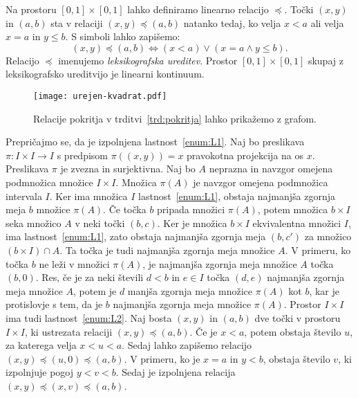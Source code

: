 \documentclass[../TG_magistrsko_delo_sections.tex]{subfiles}
\begin{document}
\begin{primer}
Na prostoru $[0, 1] \times [0, 1]$ lahko definiramo linearno relacijo $\preccurlyeq$. Točki $(x, y)$ in $(a, b)$ sta v relaciji $(x, y) \preccurlyeq (a, b)$ natanko tedaj, ko velja $x < a$ ali velja $x = a$ in $y \leq b$. S simboli lahko zapišemo:
$$(x, y) \preccurlyeq (a, b) \Leftrightarrow (x < a) \lor (x = a \land y \leq b).$$
Relacijo $\preccurlyeq$ imenujemo \emph{leksikografska ureditev}. Prostor $[0, 1] \times [0, 1]$ skupaj z leksikografsko ureditvijo je linearni kontinuum. 

\begin{figure}[h]
  \centering
  \texttt{[image: urejen-kvadrat.pdf]}
  \caption[Primer vektorske slike.]{Relacije pokritja v trditvi~\ref{trd:pokritja} lahko prikažemo z grafom.}
  \label{fig:varsavski_lok}
\end{figure}

Prepričajmo se, da je izpolnjena lastnost~\ref{enum:L1}. Naj bo preslikava $\pi : I \times I \to I$ s predpisom $\pi((x, y)) = x$ pravokotna projekcija na os $x$. Preslikava $\pi$ je zvezna in surjektivna. Naj bo $A$ neprazna in navzgor omejena podmnožica množice $I \times I$. Množica $\pi(A)$ je navzgor omejena podmnožica intervala $I$. Ker ima množica $I$ lastnost~\ref{enum:L1}, obstaja najmanjša zgornja meja $b$ množice $\pi(A)$. Če točka $b$ pripada množici $\pi(A)$, potem množica $b \times I$ seka množico $A$ v neki točki $(b, c)$. Ker je množica $b \times I$ ekvivalentna množici $I$, ima lastnost~\ref{enum:L1}, zato obstaja najmanjša zgornja meja $(b, c')$ za množico $(b \times I) \cap A$. Ta točka je tudi najmanjša zgornja meja množice $A$.
V primeru, ko točka $b$ ne leži v množici $\pi(A)$, je najmanjša zgornja meja množice $A$ točka $(b, 0)$. Res, če je za neki števili $d < b$ in $e \in I$ točka $(d, e)$ najmanjša zgornja meja množice $A$, potem je $d$ manjša zgornja meja množice $\pi(A)$ kot $b$, kar je protislovje s tem, da je $b$ najmanjša zgornja meja množice $\pi(A)$.
Prostor $I \times I$ ima tudi lastnost~\ref{enum:L2}. Naj bosta $(x, y)$ in $(a, b)$ dve točki v prostoru $I \times I$, ki ustrezata relaciji $(x, y) \preccurlyeq (a, b)$. Če je $x < a$, potem obstaja število $u$, za katerega velja $x<u<a$. Sedaj lahko zapišemo relacijo $(x, y) \preccurlyeq (u, 0) \preccurlyeq (a, b)$. V primeru, ko je $x=a$ in $y<b$, obstaja število $v$, ki izpolnjuje pogoj $y<v<b$. Sedaj je izpolnjena relacija $(x, y) \preccurlyeq (x, v) \preccurlyeq (a, b)$. 
\end{primer}
\end{document}
